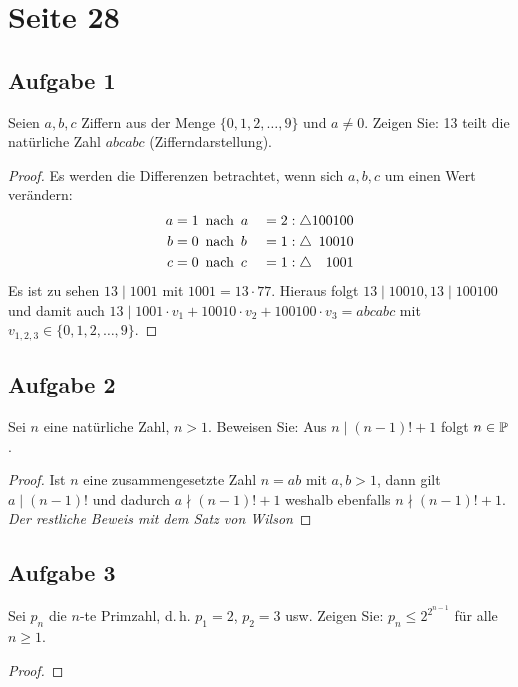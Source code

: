 \section{Seite 28}

\subsection{Aufgabe 1}
Seien $a,b,c$ Ziffern aus der Menge $\{0,1,2,\dotsc,9\}$ und $a \neq 0$.
Zeigen Sie: 13 teilt die natürliche Zahl $abcabc$ (Zifferndarstellung).
\begin{proof}
  Es werden die Differenzen betrachtet, wenn sich $a, b, c$ um einen Wert verändern:
  \begin{alignat*}{2}
    a & = 1 \enspace\text{nach}\enspace a &  & = 2 : \triangle 100100            \\
    b & = 0 \enspace\text{nach}\enspace b &  & = 1 : \triangle \hphantom{0}10010 \\
    c & = 0 \enspace\text{nach}\enspace c &  & = 1 : \triangle \hphantom{00}1001
  \end{alignat*}
  Es ist zu sehen $13 \mid 1001$ mit $1001 = 13 \cdot 77$.
  Hieraus folgt $13 \mid 10010, 13 \mid 100100$ und damit auch
  $13 \mid 1001 \cdot v_1 + 10010 \cdot v_2 + 100100 \cdot v_3 = abcabc$
  mit $v_{1,2,3} \in \{0,1,2,\dotsc,9\}$.
\end{proof}

\newpage
\subsection{Aufgabe 2}
Sei $n$ eine natürliche Zahl, $n > 1$. Beweisen Sie: Aus $n \mid (n - 1)! + 1$
folgt $n \in \mathbb{P}{}$.
\begin{proof}
  Ist $n$ eine zusammengesetzte Zahl $n = ab$ mit $a,b > 1$, dann gilt
  $a \mid (n - 1)!$ und dadurch $a \nmid (n - 1)! + 1$ weshalb ebenfalls
  $n \nmid (n - 1)! + 1$. \\[4pt]
  \emph{Der restliche Beweis mit dem Satz von Wilson}
\end{proof}

\newpage
\subsection{Aufgabe 3}
Sei $p_n$ die $n$-te Primzahl, d.\,h. $p_1 = 2$, $p_2 = 3$ usw. Zeigen Sie:
$p_n \leq 2^{2^{n - 1}}$ für alle $n \geq 1$.
\begin{proof}
\end{proof}

